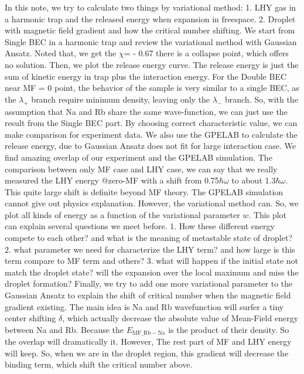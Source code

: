 In this note, we try to calculate two things by variational method: 1. LHY gas in a harmonic trap and the released energy when expansion in freespace. 2. Droplet  with magnetic field gradient and how the critical number shifting. 
We start from Single BEC in a harmonic trap and review the variational method with Gaussian Ansatz. Noted that, we get the $\chi $= - 0.67 there is a collapse point, which offers no solution. Then, we plot the release energy curve. The release energy is just the sum of kinetic energy in trap plus the interaction energy. 
For the Double BEC near MF = 0 point, the behavior of the sample is very similar to a single BEC, as the $\lambda _+$ branch require minimum density, leaving only the $\lambda _-$ branch. So, with the assumption that Na and Rb share the same wave-function, we can just use the result from the Single BEC part. By choosing { }correct characteristic value, we can make comparison for experiment data.
We also use the GPELAB to calculate the release energy, due to Gaussian Ansatz does not fit for large interaction case. We find amazing overlap of our experiment and the GPELAB simulation. The comparison between only MF case and LHY case, we can say that we really measured the LHY energy @zero-MF with a shift from 0.75$\hbar \omega $ to about 1.3$\hbar \omega $. This quite large shift is definite beyond MF theory.
The GPELAB simulation cannot give out physics explanation. However, the variational method can. So, we plot all kinds of energy as a function of the variational parameter $w$. This plot can explain several questions we meet before. 1. How these different energy compete to each other? and what is the meaning of metastable state of droplet? 2. what parameter we need for characterize the LHY term? and how large is this term compare to MF term and others? 3. what will happen if the initial state not match the droplet state? will the expansion over the local maximum and miss the droplet formation?
Finally, we try to add one more variational parameter to the Gaussian Ansatz to explain the shift of critical number when the magnetic field gradient existing. The main idea is Na and Rb wavefunction will surfer a tiny center shifting $\delta $, which actually decrease the absolute value of Mean-Field energy between Na and Rb. Because the $E_{\text{MF$\_$Rb}-\text{Na}}$ is the product of their density. So the overlap will dramatically it. However, The rest part of MF and LHY energy will keep. So, when we are in the droplet region, this gradient will decrease the binding term, which shift the critical number above.

